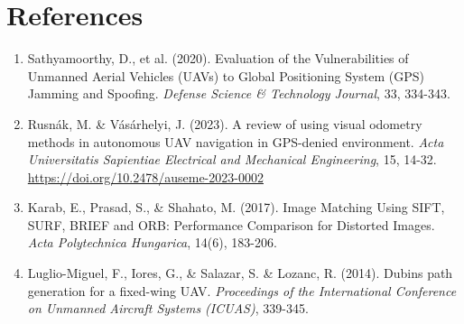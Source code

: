 \section*{References}
\begin{enumerate}
    \item Sathyamoorthy, D., et al. (2020). Evaluation of the Vulnerabilities of Unmanned Aerial Vehicles (UAVs) to Global Positioning System (GPS) Jamming and Spoofing. \textit{Defense Science \& Technology Journal}, 33, 334-343.
    \item Rusnák, M. \& Vásárhelyi, J. (2023). A review of using visual odometry methods in autonomous UAV navigation in GPS-denied environment. \textit{Acta Universitatis Sapientiae Electrical and Mechanical Engineering}, 15, 14-32. \url{https://doi.org/10.2478/auseme-2023-0002}
    \item Karab, E., Prasad, S., \& Shahato, M. (2017). Image Matching Using SIFT, SURF, BRIEF and ORB: Performance Comparison for Distorted Images. \textit{Acta Polytechnica Hungarica}, 14(6), 183-206.
    \item Luglio-Miguel, F., Iores, G., \& Salazar, S. \& Lozanc, R. (2014). Dubins path generation for a fixed-wing UAV. \textit{Proceedings of the International Conference on Unmanned Aircraft Systems (ICUAS)}, 339-345.
\end{enumerate}
